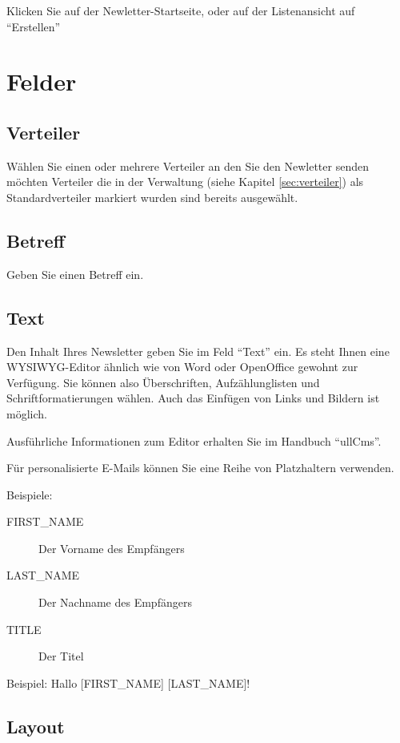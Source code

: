 \documentclass[article, a4paper, oneside, 11pt]{memoir}
\begin{document}
Klicken Sie auf der Newletter-Startseite, oder auf der Listenansicht auf "`Erstellen"'

\section{Felder}

\subsection{Verteiler}

Wählen Sie einen oder mehrere Verteiler an den Sie den Newletter senden möchten
Verteiler die in der Verwaltung (siehe Kapitel \vref{sec:verteiler}) als Standardverteiler markiert wurden sind bereits ausgewählt.

\subsection{Betreff}

Geben Sie einen Betreff ein.

\subsection{Text}

Den Inhalt Ihres Newsletter geben Sie im Feld "`Text"' ein. Es steht Ihnen eine WYSIWYG-Editor ähnlich wie von Word oder OpenOffice gewohnt zur Verfügung. Sie können also Überschriften, Aufzählunglisten und Schriftformatierungen wählen. Auch das Einfügen von Links und Bildern ist möglich.

Ausführliche Informationen zum Editor erhalten Sie im Handbuch "`ullCms"'.

Für personalisierte E-Mails können Sie eine Reihe von Platzhaltern verwenden.

Beispiele:
\begin{description}
 \item[\lbrack FIRST\_NAME\rbrack] Der Vorname des Empfängers
 \item[\lbrack LAST\_NAME\rbrack] Der Nachname des Empfängers
 \item[\lbrack TITLE\rbrack] Der Titel
\end{description}

Beispiel: Hallo [FIRST\_NAME] [LAST\_NAME]!

\subsection{Layout}
\end{document}
